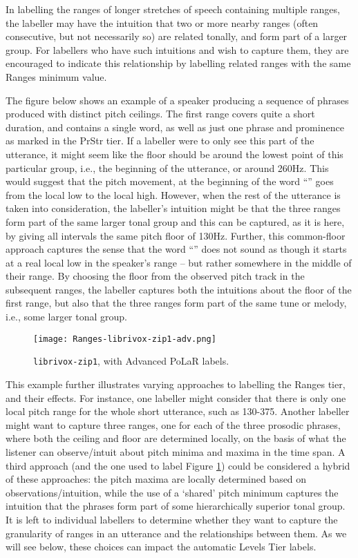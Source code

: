 In labelling the ranges of longer stretches of speech containing multiple ranges, the labeller may have the intuition that two or more nearby ranges (often consecutive, but not necessarily so) are related tonally, and form part of a larger group. For labellers who have such intuitions and wish to capture them, they are encouraged to indicate this relationship by labelling related ranges with the same Ranges minimum value.

The figure below shows an example of a speaker producing a sequence of phrases produced with distinct pitch ceilings. The first range covers quite a short duration, and contains a single word, as well as just one phrase and prominence as marked in the PrStr tier. If a labeller were to only see this part of the utterance, it might seem like the floor should be around the lowest point of this particular group, i.e., the beginning of the utterance, or around 260Hz. This would suggest that the pitch movement, at the beginning of the word “” goes from the local low to the local high. However, when the rest of the utterance is taken into consideration, the labeller’s  intuition might be that the three ranges form part of the same larger tonal group and this can be captured, as it is here, by giving all intervals the same pitch floor of 130Hz. Further, this common-floor approach captures the sense that the word “” does not sound as though it starts at a real local low in the speaker’s range – but rather somewhere in the middle of their range. By choosing the floor from the observed pitch track in the subsequent ranges, the labeller captures both the intuitions about the floor of the first range, but also that the three ranges form part of the same tune or melody, i.e., some larger tonal group.

\begin{figure}[H]
\centering
%
\texttt{[image: Ranges-librivox-zip1-adv.png]}
%
\caption{\texttt{librivox-zip1}, with Advanced PoLaR labels.%
\label{fig:librivox-zip1 Ranges Adv}%
}
\end{figure}

This example further illustrates varying approaches to labelling the Ranges tier, and their effects. For instance, one labeller might consider that there is only one local pitch range for the whole short utterance, such as 130-375. Another labeller might want to capture three ranges, one for each of the three prosodic phrases, where both the ceiling and floor are determined locally, on the basis of what the listener can observe\slash intuit about pitch minima and maxima in the time span. A third approach (and the one used to label Figure \ref{fig:librivox-zip1 Ranges Adv}) could be considered a hybrid of these approaches: the pitch maxima are locally determined based on observations\slash intuition, while the use of a ‘shared’ pitch minimum captures the intuition that the phrases form part of some hierarchically superior tonal group. It is left to individual labellers to determine whether they want to capture the granularity of ranges in an utterance and the relationships between them. As we will see below, these choices can impact the automatic Levels Tier labels.

